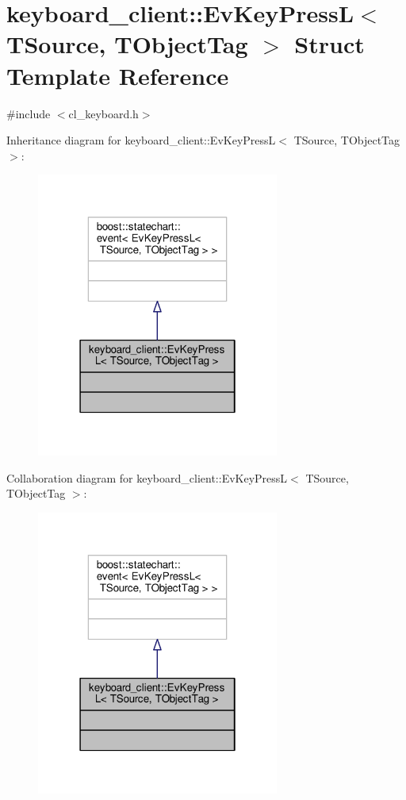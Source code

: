 \hypertarget{structkeyboard__client_1_1EvKeyPressL}{}\section{keyboard\+\_\+client\+:\+:Ev\+Key\+PressL$<$ T\+Source, T\+Object\+Tag $>$ Struct Template Reference}
\label{structkeyboard__client_1_1EvKeyPressL}


{\ttfamily \#include $<$cl\+\_\+keyboard.\+h$>$}



Inheritance diagram for keyboard\+\_\+client\+:\+:Ev\+Key\+PressL$<$ T\+Source, T\+Object\+Tag $>$\+:\nopagebreak
\begin{figure}[H]
\begin{center}
\leavevmode
\includegraphics[width=226pt]{structkeyboard__client_1_1EvKeyPressL__inherit__graph}
\end{center}
\end{figure}


Collaboration diagram for keyboard\+\_\+client\+:\+:Ev\+Key\+PressL$<$ T\+Source, T\+Object\+Tag $>$\+:\nopagebreak
\begin{figure}[H]
\begin{center}
\leavevmode
\includegraphics[width=226pt]{structkeyboard__client_1_1EvKeyPressL__coll__graph}
\end{center}
\end{figure}


